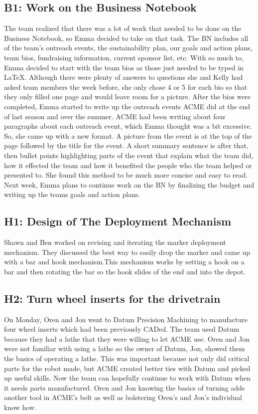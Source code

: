 \documentclass{article}
\begin{document}
\subsection{B1: Work on the Business Notebook}

The team realized that there was a lot of work that needed to be done on the Business Notebook, so Emma decided to take on that task. The BN includes all of the team's outreach events, the sustainability plan, our goals and action plans, team bios, fundraising information, current sponsor list, etc. With so much to, Emma decided to start with the team bios as those just needed to be typed in \LaTeX . Although there were plenty of answers to questions she and Kelly had asked team members the week before, she only chose 4 or 5 for each bio so that they only filled one page and would leave room for a picture. After the bios were completed, Emma started to write up the outreach events ACME did at the end of last season and over the summer. ACME had been writing about four paragraphs about each outreach event, which Emma thought was a bit excessive. So, she came up with a new format. A picture from the event is at the top of the page followed by the title for the event. A short summary sentence is after that, then bullet points highlighting parts of the event that explain what the team did, how it effected the team and how it benefited the people who the team helped or presented to. She found this method to be much more concise and easy to read. Next week, Emma plans to continue work on the BN by finalizing the budget and writing up the teams goals and action plans. \subsection{H1: Design of The Deployment Mechanism}

Shawn and Ben worked on revising and iterating the marker deployment mechanism. They discussed the best way to easily drop the marker and came up with a bar and hook mechanism.This mechanism works by setting a hook on a bar and then rotating the bar so the hook slides of the end and into the depot.

\subsection{H2: Turn wheel inserts for the drivetrain}

On Monday, Oren and Jon went to Datum Precision Machining to manufacture four wheel inserts which had been previously CADed. The team used Datum because they had a lathe that they were willing to let ACME use. Oren and Jon were not familiar with using a lathe so the owner of Datum, Jon, showed them the basics of operating a lathe. This was important because not only did critical parts for the robot made, but ACME created better ties with Datum and picked up useful skills. Now the team can hopefully continue to work with Datum when it needs parts manufactured. Oren and Jon knowing the basics of turning adds another tool in ACME’s belt as well as bolstering Oren’s and Jon’s individual know how.
\end{document}
